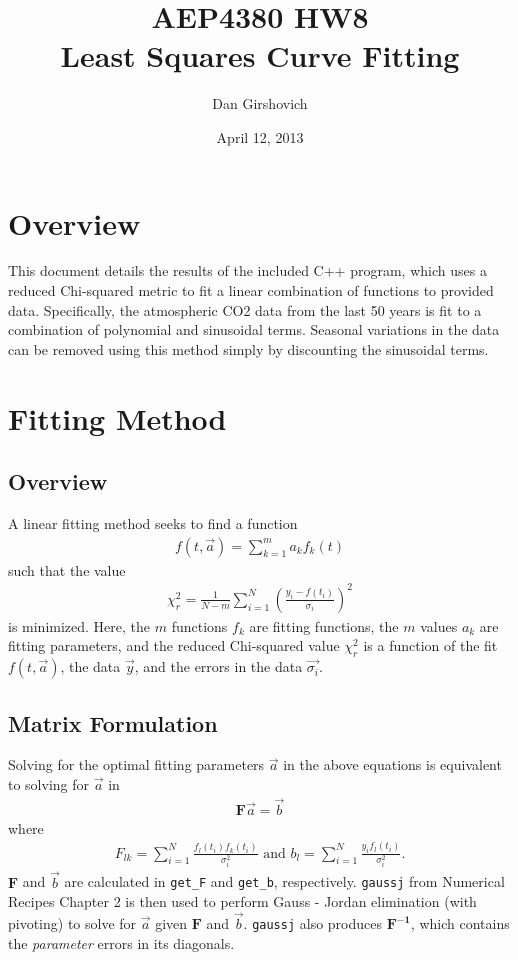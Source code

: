 \documentclass[12pt]{article}
\title{AEP4380 HW8 \\ Least Squares Curve Fitting }
\author{Dan Girshovich}
\date{April 12, 2013}
\begin{document}
\maketitle
\section{Overview}
This document details the results of the included C++ program, which uses a reduced Chi-squared metric to fit a linear combination of functions to provided data. Specifically, the atmospheric CO2 data from the last 50 years is fit to a combination of polynomial and sinusoidal terms. Seasonal variations in the data can be removed using this method simply by discounting the sinusoidal terms.
\section{Fitting Method}
\subsection{Overview}
A linear fitting method seeks to find a function
\begin{align*}
f(t, \vec{a}) = \sum_{k = 1}^{m} a_k f_k(t)
\end{align*}
such that the value
\begin{align*}
\chi_r^2 = \frac{1}{N - m} \sum_{i = 1}^{N} \left( \frac{y_i - f(t_i)}{\sigma_i} \right)^2
\end{align*}
is minimized. Here, the $m$ functions $f_k$ are fitting functions, the $m$ values $a_k$ are fitting parameters, and the reduced Chi-squared value $\chi_r^2$ is a function of the fit $f(t, \vec{a})$, the data $\vec{y}$, and the errors in the data $\vec{\sigma_i}$.
\subsection{Matrix Formulation}
Solving for the optimal fitting parameters $\vec{a}$ in the above equations is equivalent to solving for $\vec{a}$ in
\begin{align*}
\mathbf{F}\vec{a} = \vec{b}
\end{align*}
where
\begin{align*}
F_{lk} = \sum_{i=1}^{N} \frac{f_l(t_i) f_k(t_i)}{\sigma_i^2}
\text{  and  }
b_l = \sum_{i = 1}^{N} \frac{y_i f_l(t_i)}{\sigma_i^2}.
\end{align*}
$\mathbf{F}$ and $\vec{b}$ are calculated in \texttt{get\_F} and \texttt{get\_b}, respectively. \texttt{gaussj} from Numerical Recipes Chapter 2 \cite{numericalrecipes} is then used to perform Gauss - Jordan elimination (with pivoting) to solve for $\vec{a}$ given $\mathbf{F}$ and $\vec{b}$. \texttt{gaussj} also produces $\mathbf{F^{-1}}$, which contains the \emph{parameter} errors in its diagonals.
\end{document}
